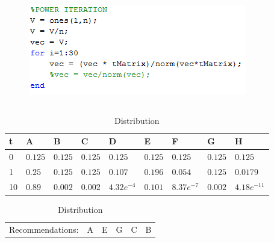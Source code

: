 \begin{frame}
\begin{table}
\begin{columns}
\begin{column}{0.6\textwidth}
			\begin{figure}
				\centering
				\includegraphics[scale=.6]{graphics/poweriteration.png}
			\end{figure}
		\end{column}
	\end{columns}
	\footnotesize
	\begin{table}
		\begin{tabular}{|l|llllllll|}\hline
			t & A & B & C & D & E & F & G & H \\ \hline
			0 & $0.125$ & $0.125$ & $0.125$ & $0.125$ & $0.125$ & $0.125$ & $0.125$ & $0.125$ \\
			1 & $0.25$ & $0.125$ & $0.125$ & $0.107$ & $0.196$ & $0.054$ & $0.125$ & $0.0179$ \\
			10& $0.89$ & $0.002$ & $0.002$ & $4.32e^{-4}$ & $0.101$ & $8.37e^{-7}$ & $0.002$ & $4.18e^{-11}$ \\
			\hline
		\end{tabular}
		\caption{Distribution}
	\end{table}
	\begin{tabular}{llllll}
		Recommendations: & A & E & G & C & B
	\end{tabular}
\end{table}
\end{frame}

%
%
%
